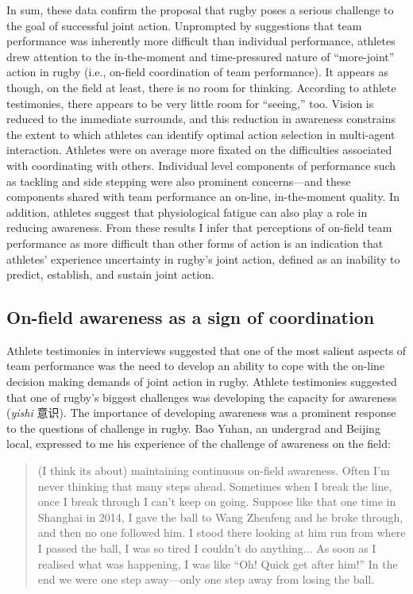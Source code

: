 \begin{CJK}{UTF8}{gbsn}
In sum, these data confirm the proposal that rugby poses a serious challenge to the goal of successful joint action.  Unprompted by suggestions that team performance was inherently more difficult than individual performance, athletes drew attention to the in-the-moment and time-pressured nature of ``more-joint'' action in rugby (i.e., on-field coordination of team performance).  It appears as though, on the field at least, there is no room for thinking.  According to athlete testimonies, there appears to be very little room for ``seeing,'' too.  Vision is reduced to the immediate surrounds, and this reduction in awareness constrains the extent to which athletes can identify optimal action selection in multi-agent interaction.  Athletes were on average more fixated on the difficulties associated with coordinating with others.  Individual level components of performance such as tackling and side stepping were also prominent concerns—and these components shared with team performance an on-line, in-the-moment quality.   In addition, athletes suggest that physiological fatigue can also play a role in reducing awareness.  From these results I infer that perceptions of on-field team performance as more difficult than other forms of action is an indication that athletes' experience uncertainty in rugby's joint action, defined as an inability to predict, establish, and sustain joint action.









\subsection{On-field awareness as a sign of coordination}
Athlete testimonies in interviews suggested that one of the most salient aspects of team performance was the need to develop an ability to cope with the on-line decision making demands of joint action in rugby.  Athlete testimonies suggested that one of rugby's biggest challenges was developing the capacity for awareness  (\textit{yishi} 意识).  The importance of developing awareness was a prominent response to the questions of challenge in rugby.  Bao Yuhan, an undergrad and Beijing local, expressed to me his experience of the challenge of awareness on the field:

    \begin{quote}
    (I think its about) maintaining continuous on-field awareness.  Often I'm never thinking that many steps ahead.  Sometimes when I break the line, once I break through I can't keep on going.  Suppose like that one time in Shanghai in 2014, I gave the ball to Wang Zhenfeng and he broke through, and then no one followed him.  I stood there looking at him run from where I passed the ball, I was so tired I couldn't do anything... As soon as I realised what was happening, I was like ``Oh! Quick get after him!'' In the end we were one step away---only one step away from losing the ball.
    \end{quote}


\end{CJK}
